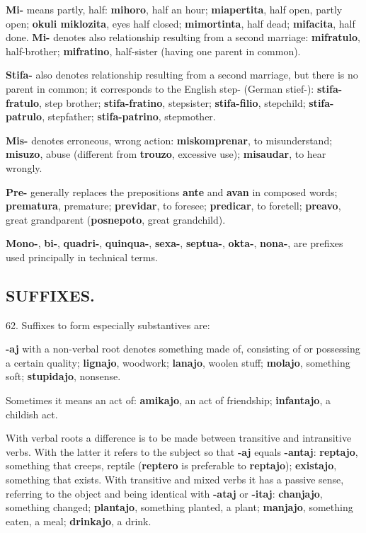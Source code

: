\textbf{Mi-} means partly, half: \textbf{mihoro}, half an hour; \textbf{miapertita}, half open, partly open; \textbf{okuli miklozita}, eyes half closed; \textbf{mimortinta}, half dead; \textbf{mifacita}, half done. \textbf{Mi-} denotes also relationship resulting from a second marriage: \textbf{mifratulo}, half-brother; \textbf{mifratino}, half-sister (having one parent in common). 

\textbf{Stifa-} also denotes relationship resulting from a second marriage, but there is no parent in common; it corresponds to the English step- (German stief-): \textbf{stifa-fratulo}, step brother; \textbf{stifa-fratino}, stepsister; \textbf{stifa-filio}, stepchild; \textbf{stifa-patrulo}, stepfather; \textbf{stifa-patrino}, stepmother. 

\textbf{Mis-} denotes erroneous, wrong action: \textbf{miskomprenar}, to misunderstand; \textbf{misuzo}, abuse (different from \textbf{trouzo}, excessive use); \textbf{misaudar}, to hear wrongly. 

\textbf{Pre-} generally replaces the prepositions \textbf{ante} and \textbf{avan} in composed words; \textbf{prematura}, premature; \textbf{previdar}, to foresee; \textbf{predicar}, to foretell; \textbf{preavo}, great grandparent (\textbf{posnepoto}, great grandchild). 

\textbf{Mono-}, \textbf{bi-}, \textbf{quadri-}, \textbf{quinqua-}, \textbf{sexa-}, \textbf{septua-}, \textbf{okta-}, \textbf{nona-}, are prefixes used principally in technical terms. 

\subsection*{SUFFIXES.}
62. Suffixes to form especially substantives are: 

\textbf{-aj} with a non-verbal root denotes something made of, consisting of or possessing a certain quality; \textbf{lignajo}, woodwork; \textbf{lanajo}, woolen stuff; \textbf{molajo}, something soft; \textbf{stupidajo}, nonsense. 

Sometimes it means an act of: \textbf{amikajo}, an act of friendship; \textbf{infantajo}, a childish act. 

With verbal roots a difference is to be made between transitive and intransitive verbs. With the latter it refers to the subject so that \textbf{-aj} equals \textbf{-antaj}: \textbf{reptajo}, something that creeps, reptile (\textbf{reptero} is preferable to \textbf{reptajo}); \textbf{existajo}, something that exists. With transitive and mixed verbs it has a passive sense, referring to the object and being identical with \textbf{-ataj} or \textbf{-itaj}: \textbf{chanjajo}, something changed; \textbf{plantajo}, something planted, a plant; \textbf{manjajo}, something eaten, a meal; \textbf{drinkajo}, a drink. 

